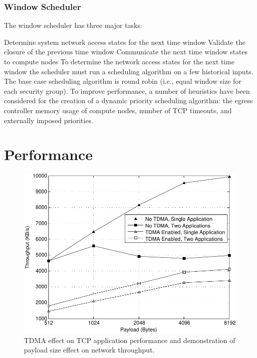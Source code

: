 \documentclass[oneside,12pt]{memoir}
\begin{document}
\subsection{Window Scheduler}
The window scheduler has three major tasks: 

Determine system network access states for the next time window 
Validate the closure of the previous time window
Communicate the next time window states to compute nodes
To determine the network access states for the next time window the scheduler must run a scheduling algorithm on a few historical inputs. The base case scheduling algorithm is round robin (i.e., equal window size for each security group). To improve performance, a number of heuristics have been considered for the creation of a dynamic priority scheduling algorithm: the egress controller memory usage of compute nodes, number of TCP timeouts, and externally imposed priorities. 
\chapter{Performance}

\begin{figure}
\centerline{\includegraphics{TCP_Performance.pdf}}
\caption{TDMA effect on TCP application performance and demonstration of payload size effect on network throughput.}
\label{fig:TCP_Performance}
\end{figure}
\end{document}
